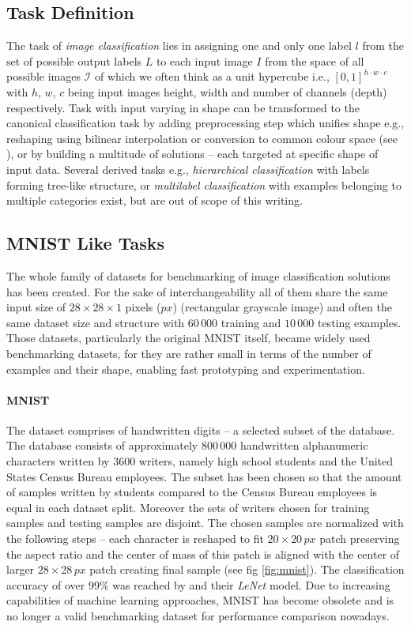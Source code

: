 \subsection{Task Definition}
The task of \emph{image classification} lies in assigning one and only one label $l$ from the set of possible output labels $L$ to each input image $I$ from the space of all possible images $\mathcal{I}$ of which we often think as a unit hypercube i.e., $[0,1]^{h \cdot w \cdot c}$ with $h$, $w$, $c$ being input images height, width and number of channels (depth) respectively. Task with input varying in shape can be transformed to the canonical classification task by adding preprocessing step which unifies shape e.g., reshaping using bilinear interpolation or conversion to common colour space (see \cite{computer_vision}), or by building a multitude of solutions -- each targeted at specific shape of input data. Several derived tasks e.g., \emph{hierarchical classification} with labels forming tree-like structure, or \emph{multilabel classification} with examples belonging to multiple categories exist, but are out of scope of this writing.

\subsection{MNIST Like Tasks}
\label{subsec:mnist_tasks}
The whole family of datasets for benchmarking of image classification solutions has been created. For the sake of interchangeability all of them share the same input size of $28 \times 28 \times 1$ pixels ($px$) (rectangular grayscale image) and often the same dataset size and structure with $60\,000$ training and $10\,000$ testing examples. Those datasets, particularly the original MNIST itself, became widely used benchmarking datasets, for they are rather small in terms of the number of examples and their shape, enabling fast prototyping and experimentation.

\paragraph{MNIST}

The dataset comprises of handwritten digits -- a selected subset of the \cite{NIST_19} database. The database consists of approximately $800\,000$ handwritten alphanumeric characters written by 3600 writers, namely high school students and the United States Census Bureau employees. The subset has been chosen so that the amount of samples written by students compared to the Census Bureau employees is equal in each dataset split. Moreover the sets of writers chosen for training samples and testing samples are disjoint. The chosen samples are normalized with the following steps -- each character is reshaped to fit $20 \times 20\,px$ patch preserving the aspect ratio and the center of mass of this patch is aligned with the center of larger $28 \times 28\,px$ patch creating final sample (see fig \ref{fig:mnist}). The classification accuracy of over 99\% was reached by \cite{Lecun98gradient-basedlearning} and their \emph{LeNet} model. Due to increasing capabilities of machine learning approaches, MNIST has become obsolete and is no longer a valid benchmarking dataset for performance comparison nowadays.


